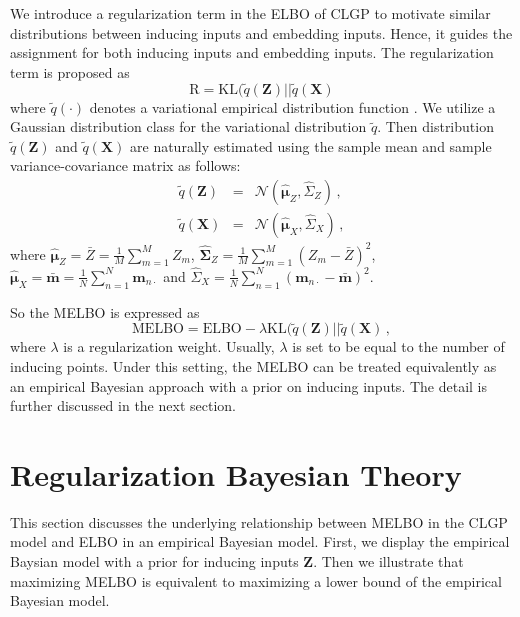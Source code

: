 \documentclass{article}
\begin{document}
We introduce a regularization term in the ELBO of CLGP to motivate similar distributions between inducing inputs and embedding inputs. Hence, it guides the assignment for both inducing inputs and embedding inputs. The regularization term is proposed as 
\begin{equation}
\mathrm{R} = \mathrm{KL}(\tilde{q}(\bm Z)||\tilde{q}(\bm X) \nonumber
\end{equation} 
where $\tilde{q}(\cdot)$ denotes a variational empirical distribution function . We utilize a Gaussian distribution class for the variational distribution $\tilde{q}$. Then distribution $\tilde{q}(\bm Z)$ and $\tilde{q}(\bm X)$ are naturally estimated using the sample mean and sample variance-covariance matrix as follows:
\begin{eqnarray}
\tilde{q}(\bm Z) & = & \mathcal{N}(\hat{\bm\mu}_Z, \hat{\Sigma}_Z)\,, \\
\tilde{q}(\bm X) & = & \mathcal{N}(\hat{\bm\mu}_X, \hat{\Sigma}_X)\,,
\end{eqnarray}
where $\hat{\bm\mu}_Z = \bar{Z} = \frac{1}{M}\sum_{m=1}^{M}Z_m$, $\hat{\bm\Sigma}_Z = \frac{1}{M}\sum_{m=1}^{M}( Z_m-\bar{Z})^2$, $\hat{\bm\mu}_X = \bar{\bm m} = \frac{1}{N}\sum_{n=1}^{N}\bm m_{n\cdot}$ and  $\hat{\Sigma}_X = \frac{1}{N}\sum_{n=1}^{N}(\bm m_{n\cdot} - \bar{\bm m})^2$.

So the MELBO is expressed as
\begin{equation}
\mathrm{MELBO} = \mathrm{ELBO} - \lambda\mathrm{KL}(\tilde{q}(\bm Z)||\tilde{q}(\bm X)\,,
\end{equation}
where $\lambda$ is a regularization weight. Usually, $\lambda$ is set to be equal to the number of inducing points. Under this setting, the MELBO can be treated equivalently as an empirical Bayesian approach with a prior on inducing inputs. The detail is further discussed in the next section.

\section{Regularization Bayesian Theory} 
This section discusses the underlying relationship between MELBO in the CLGP model and ELBO in an empirical Bayesian model. First, we display the empirical Baysian model with a prior for inducing inputs $\bm Z$. Then we illustrate that maximizing MELBO is equivalent to maximizing a lower bound of the empirical Bayesian model.
\end{document}
